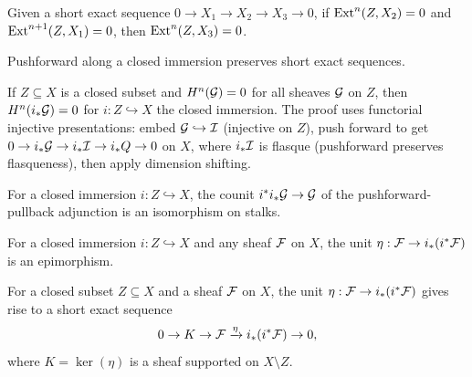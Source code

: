 \begin{lemma}\label{lem:ext_dimension_shift_X3}
  \leanok
  Given a short exact sequence $0 \to X_1 \to X_2 \to X_3 \to 0$,
  if $\operatorname{Ext}^n(Z, X_2) = 0$ and $\operatorname{Ext}^{n+1}(Z, X_1) = 0$,
  then $\operatorname{Ext}^n(Z, X_3) = 0$.
\end{lemma}

\begin{lemma}\label{lem:closedIncl_pushforward_shortExact}
  \leanok
  Pushforward along a closed immersion preserves short exact sequences.
\end{lemma}

\begin{theorem}\label{thm:PushforwardHVanishing}
  \leanok
  If $Z \subseteq X$ is a closed subset and $H^n(\mathcal{G}) = 0$ for all sheaves $\mathcal{G}$
  on $Z$, then $H^n(i_* \mathcal{G}) = 0$ for $i : Z \hookrightarrow X$ the closed immersion.
  The proof uses functorial injective presentations: embed $\mathcal{G} \hookrightarrow \mathcal{I}$
  (injective on $Z$), push forward to get $0 \to i_*\mathcal{G} \to i_*\mathcal{I} \to i_*Q \to 0$
  on $X$, where $i_*\mathcal{I}$ is flasque (pushforward preserves flasqueness), then
  apply dimension shifting.
\end{theorem}

\begin{lemma}\label{lem:closedIncl_counit_isIso}
  \leanok
  For a closed immersion $i : Z \hookrightarrow X$, the counit
  $i^* i_* \mathcal{G} \to \mathcal{G}$ of the pushforward-pullback adjunction is an isomorphism
  on stalks.
\end{lemma}

\begin{lemma}\label{lem:epi_unit_of_closedImmersion}
  \leanok
  For a closed immersion $i : Z \hookrightarrow X$ and any sheaf $\mathcal{F}$ on $X$,
  the unit $\eta : \mathcal{F} \to i_*(i^*\mathcal{F})$ is an epimorphism.
\end{lemma}

\begin{theorem}\label{thm:closedImmersionSES}
  \leanok
  For a closed subset $Z \subseteq X$ and a sheaf $\mathcal{F}$ on $X$, the unit
  $\eta : \mathcal{F} \to i_*(i^*\mathcal{F})$ gives rise to a short exact sequence
  \[
    0 \to K \to \mathcal{F} \xrightarrow{\eta} i_*(i^*\mathcal{F}) \to 0,
  \]
  where $K = \ker(\eta)$ is a sheaf supported on $X \setminus Z$.
\end{theorem}

